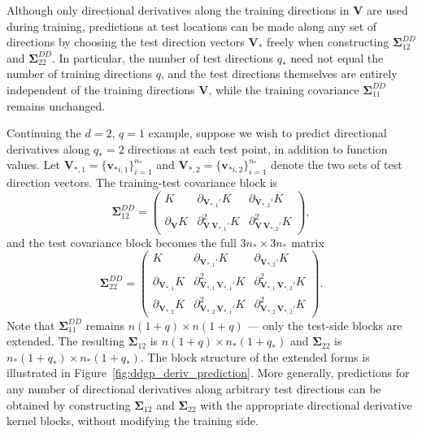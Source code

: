 \documentclass[12pt]{article}
\begin{document}
Although only directional derivatives along the training directions in $\mathbf{V}$ are used during training, predictions at test locations can be made along any set of directions by choosing the test direction vectors $\mathbf{V}_*$ freely when constructing $\boldsymbol{\Sigma}_{12}^{DD}$ and $\boldsymbol{\Sigma}_{22}^{DD}$. In particular, the number of test directions $q_*$ need not equal the number of training directions $q$, and the test directions themselves are entirely independent of the training directions $\mathbf{V}$, while the training covariance $\boldsymbol{\Sigma}_{11}^{DD}$ remains unchanged.


	Continuing the $d=2$, $q=1$ example, suppose we wish to predict directional derivatives along $q_* = 2$ directions at each test point, in addition to function values. Let $\mathbf{V}_{*,1} = \{\mathbf{v}_{*i,1}\}_{i=1}^{n_*}$ and $\mathbf{V}_{*,2} = \{\mathbf{v}_{*i,2}\}_{i=1}^{n_*}$ denote the two sets of test direction vectors. The training-test covariance block is
	\begin{equation}
		\boldsymbol{\Sigma}_{12}^{DD} =
		\begin{pmatrix}
			K & \partial_{\mathbf{V}_{*,1}'} K & \partial_{\mathbf{V}_{*,2}'} K \\[8pt]
			\partial_{\mathbf{V}} K & \partial^2_{\mathbf{V}\,\mathbf{V}_{*,1}'} K & \partial^2_{\mathbf{V}\,\mathbf{V}_{*,2}'} K
		\end{pmatrix},
	\end{equation}
	and the test covariance block becomes the full $3n_* \times 3n_*$ matrix
	\begin{equation}
		\boldsymbol{\Sigma}_{22}^{DD} =
		\begin{pmatrix}
			K & \partial_{\mathbf{V}_{*,1}'} K & \partial_{\mathbf{V}_{*,2}'} K \\[8pt]
			\partial_{\mathbf{V}_{*,1}} K & \partial^2_{\mathbf{V}_{*,1}\,\mathbf{V}_{*,1}'} K & \partial^2_{\mathbf{V}_{*,1}\,\mathbf{V}_{*,2}'} K \\[8pt]
			\partial_{\mathbf{V}_{*,2}} K & \partial^2_{\mathbf{V}_{*,2}\,\mathbf{V}_{*,1}'} K & \partial^2_{\mathbf{V}_{*,2}\,\mathbf{V}_{*,2}'} K
		\end{pmatrix}.
	\end{equation}
	Note that $\boldsymbol{\Sigma}_{11}^{DD}$ remains $n(1+q) \times n(1+q)$ — only the test-side blocks are extended. The resulting $\boldsymbol{\Sigma}_{12}$ is $n(1+q) \times n_*(1+q_*)$ and $\boldsymbol{\Sigma}_{22}$ is $n_*(1+q_*) \times n_*(1+q_*)$. The block structure of the extended forms is illustrated in Figure~\ref{fig:ddgp_deriv_prediction}. More generally, predictions for any number of directional derivatives along arbitrary test directions can be obtained by constructing $\boldsymbol{\Sigma}_{12}$ and $\boldsymbol{\Sigma}_{22}$ with the appropriate directional derivative kernel blocks, without modifying the training side.
\end{document}
